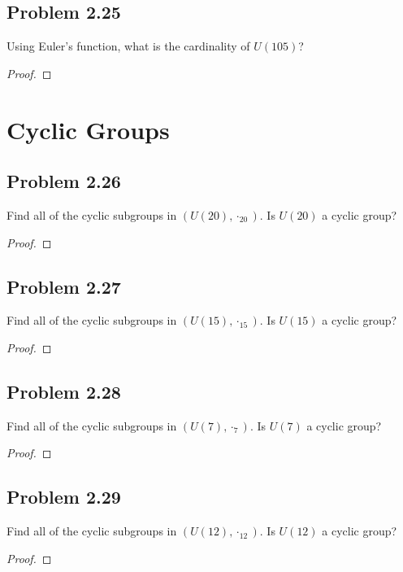 \documentclass{amsbook}
\begin{document}
			\subsection*{Problem 2.25}
			\label{sub:problem_2_25}
			Using Euler's function, what is the cardinality of $U(105)$?
			\begin{proof}
			\end{proof}

		\section{Cyclic Groups}
		\label{sec:cyclic_groups}
			\subsection*{Problem 2.26}
			\label{sub:problem_2_26}
			Find all of the cyclic subgroups in $(U(20), \cdot_{20})$.
			Is $U(20)$ a cyclic group?
			\begin{proof}
			\end{proof}

			\subsection*{Problem 2.27}
			\label{sub:problem_2_27}
			Find all of the cyclic subgroups in $(U(15), \cdot_{15})$.
			Is $U(15)$ a cyclic group?
			\begin{proof}
			\end{proof}

			\subsection*{Problem 2.28}
			\label{sub:problem_2_28}
			Find all of the cyclic subgroups in $(U(7), \cdot_{7})$.
			Is $U(7)$ a cyclic group?
			\begin{proof}
			\end{proof}

			\subsection*{Problem 2.29}
			\label{sub:problem_2_29}
			Find all of the cyclic subgroups in $(U(12), \cdot_{12})$.
			Is $U(12)$ a cyclic group?
			\begin{proof}
			\end{proof}
\end{document}
